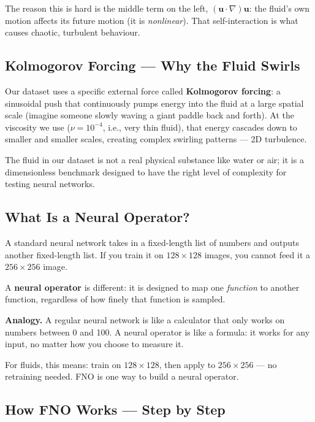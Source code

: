 \documentclass[acmsmall,nonacm]{acmart}
\begin{document}
The reason this is hard is the middle term on the left, $(\mathbf{u} \cdot
\nabla)\mathbf{u}$: the fluid's own motion affects its future motion (it is
\emph{nonlinear}).
That self-interaction is what causes chaotic, turbulent behaviour.

\subsection{Kolmogorov Forcing --- Why the Fluid Swirls}

Our dataset uses a specific external force called \textbf{Kolmogorov forcing}:
a sinusoidal push that continuously pumps energy into the fluid at a
large spatial scale (imagine someone slowly waving a giant paddle back and
forth).
At the viscosity we use ($\nu = 10^{-4}$, i.e., very thin fluid), that energy
cascades down to smaller and smaller scales, creating complex swirling patterns
--- 2D turbulence.

The fluid in our dataset is not a real physical substance like water or air; it
is a dimensionless benchmark designed to have the right level of complexity for
testing neural networks.

\subsection{What Is a Neural Operator?}

A standard neural network takes in a fixed-length list of numbers and outputs
another fixed-length list.
If you train it on $128 \times 128$ images, you cannot feed it a $256 \times
256$ image.

A \textbf{neural operator} is different: it is designed to map one
\emph{function} to another function, regardless of how finely that function is
sampled.

\begin{analogybox}
\textbf{Analogy.}
A regular neural network is like a calculator that only works on numbers between
0 and 100.
A neural operator is like a formula: it works for any input, no matter how you
choose to measure it.
\end{analogybox}

For fluids, this means: train on $128 \times 128$, then apply to $256 \times
256$ --- no retraining needed.
FNO is one way to build a neural operator.

\subsection{How FNO Works --- Step by Step}
\end{document}

